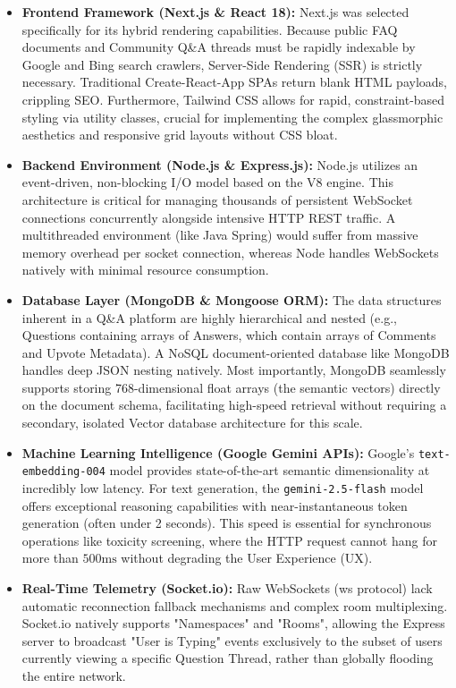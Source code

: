 \documentclass[12pt,a4paper]{article}
\begin{document}
\begin{itemize}
    \item \textbf{Frontend Framework (Next.js \& React 18):} Next.js was selected specifically for its hybrid rendering capabilities. Because public FAQ documents and Community Q\&A threads must be rapidly indexable by Google and Bing search crawlers, Server-Side Rendering (SSR) is strictly necessary. Traditional Create-React-App SPAs return blank HTML payloads, crippling SEO. Furthermore, Tailwind CSS allows for rapid, constraint-based styling via utility classes, crucial for implementing the complex glassmorphic aesthetics and responsive grid layouts without CSS bloat.
    
    \item \textbf{Backend Environment (Node.js \& Express.js):} Node.js utilizes an event-driven, non-blocking I/O model based on the V8 engine. This architecture is critical for managing thousands of persistent WebSocket connections concurrently alongside intensive HTTP REST traffic. A multithreaded environment (like Java Spring) would suffer from massive memory overhead per socket connection, whereas Node handles WebSockets natively with minimal resource consumption.
    
    \item \textbf{Database Layer (MongoDB \& Mongoose ORM):} The data structures inherent in a Q\&A platform are highly hierarchical and nested (e.g., Questions containing arrays of Answers, which contain arrays of Comments and Upvote Metadata). A NoSQL document-oriented database like MongoDB handles deep JSON nesting natively. Most importantly, MongoDB seamlessly supports storing 768-dimensional float arrays (the semantic vectors) directly on the document schema, facilitating high-speed retrieval without requiring a secondary, isolated Vector database architecture for this scale.
    
    \item \textbf{Machine Learning Intelligence (Google Gemini APIs):} Google's \texttt{text-embedding-004} model provides state-of-the-art semantic dimensionality at incredibly low latency. For text generation, the \texttt{gemini-2.5-flash} model offers exceptional reasoning capabilities with near-instantaneous token generation (often under 2 seconds). This speed is essential for synchronous operations like toxicity screening, where the HTTP request cannot hang for more than $500\text{ms}$ without degrading the User Experience (UX).
    
    \item \textbf{Real-Time Telemetry (Socket.io):} Raw WebSockets (ws protocol) lack automatic reconnection fallback mechanisms and complex room multiplexing. Socket.io natively supports "Namespaces" and "Rooms", allowing the Express server to broadcast "User is Typing" events exclusively to the subset of users currently viewing a specific Question Thread, rather than globally flooding the entire network.
\end{itemize}
\end{document}
